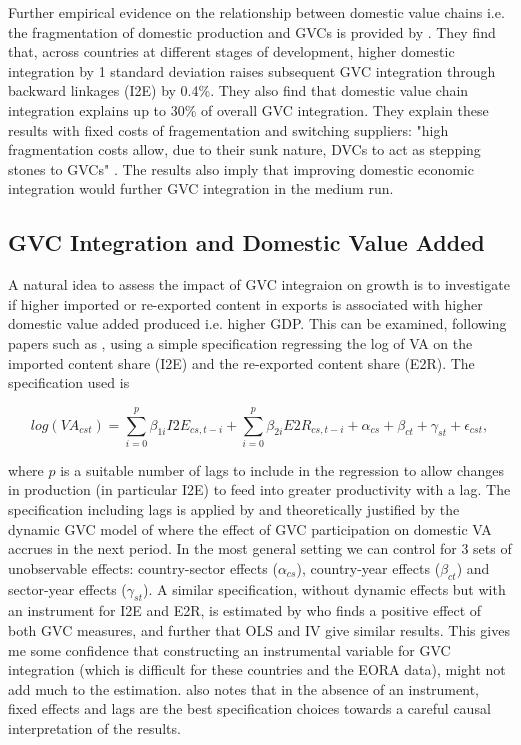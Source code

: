 \documentclass[a4paper]{article}
\begin{document}

Further empirical evidence on the relationship between domestic value chains i.e. the fragmentation of domestic production and GVCs is provided by \citet{beverelli2019domestic}. They find that, across countries at different stages of development, higher domestic integration by 1 standard deviation raises subsequent GVC integration through backward linkages (I2E) by 0.4\%. They also find that domestic value chain integration explains up to 30\% of overall GVC integration. They explain these results with fixed costs of fragementation and switching suppliers: "high fragmentation costs allow, due to their sunk nature, DVCs to act as stepping stones to GVCs" \citep{beverelli2019domestic}. The results also imply that improving domestic economic integration would further GVC integration in the medium run. %

\subsection{GVC Integration and Domestic Value Added}

A natural idea to assess the impact of GVC integraion on growth is to investigate if higher imported or re-exported content in exports is associated with higher domestic value added produced i.e. higher GDP. This can be examined, following papers such as \citet{kummritz2015global}, using a simple specification regressing the log of VA on the imported content share (I2E) and the re-exported content share (E2R). The specification used is

\begin{equation} \label{eq:GROWTH_HDFE}
log(VA_{cst}) = \sum_{i=0}^p \beta_{1i} I2E_{cs,t-i} + \sum_{i = 0}^p \beta_{2i} E2R_{cs,t-i}  + \alpha_{cs} + \beta_{ct} +\gamma_{st} + \epsilon_{cst},
\end{equation}

where $p$ is a suitable number of lags to include in the regression to allow changes in production (in particular I2E) to feed into greater productivity with a lag. The specification including lags is applied by \citet{kummritz2015global} and theoretically justified by the dynamic GVC model of \citet{LiLiu2015moving} where the effect of GVC participation on domestic VA accrues in the next period. In the most general setting we can control for 3 sets of unobservable effects: country-sector effects ($\alpha_{cs}$), country-year effects ($\beta_{ct}$) and sector-year effects ($\gamma_{st}$). A similar specification, without dynamic effects but with an instrument for I2E and E2R, is estimated by \citet{Kummritz20161} who finds a positive effect of both GVC measures, and further that OLS and IV give similar results. This gives me some confidence that constructing an instrumental variable for GVC integration (which is difficult for these countries and the EORA data), might not add much to the estimation. \citet{kummritz2015global} also notes that in the absence of an instrument, fixed effects and lags are the best specification choices towards a careful causal interpretation of the results.  \newline
\end{document}
